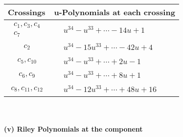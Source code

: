 \documentclass[1p]{elsarticle_modified}
\theoremstyle{definition}
\begin{document}
\begin{tabular}{m{50pt}|m{274pt}}
Crossings & \hspace{64pt}u-Polynomials at each crossing \\
\hline $$\begin{aligned}c_{1},c_{3},c_{4}\\c_{7}\end{aligned}$$&$\begin{aligned}
&u^{34}- u^{33}+\cdots-14 u+1
\end{aligned}$\\
\hline $$\begin{aligned}c_{2}\end{aligned}$$&$\begin{aligned}
&u^{34}-15 u^{33}+\cdots-42 u+4
\end{aligned}$\\
\hline $$\begin{aligned}c_{5},c_{10}\end{aligned}$$&$\begin{aligned}
&u^{34}- u^{33}+\cdots+2 u-1
\end{aligned}$\\
\hline $$\begin{aligned}c_{6},c_{9}\end{aligned}$$&$\begin{aligned}
&u^{34}- u^{33}+\cdots+8 u+1
\end{aligned}$\\
\hline $$\begin{aligned}c_{8},c_{11},c_{12}\end{aligned}$$&$\begin{aligned}
&u^{34}-12 u^{33}+\cdots+48 u+16
\end{aligned}$\\
\hline
\end{tabular}\\~\\
\newpage\renewcommand{\arraystretch}{1}
\flushleft \textbf{(v) Riley Polynomials at the component}\newline \\
\end{document}
